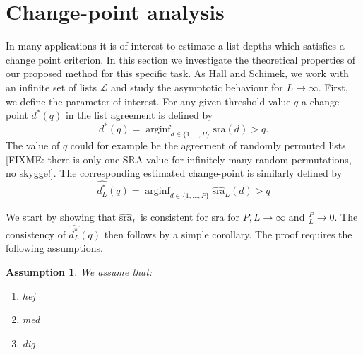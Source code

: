 \documentclass[12pt,a4paper]{article}
\DeclareMathOperator{\arginf}{arginf}
\theoremstyle{plain}
\newtheorem{assumption}{Assumption}
\begin{document}
\section{Change-point analysis}\label{sec:chgpoint}
In many applications it is of interest to estimate a list depths which
satisfies a change point criterion. In this section we investigate the
theoretical properties of our proposed method for this specific
task. As Hall and Schimek, we work with an infinite set of lists
$\mathcal{L}$ and study the asymptotic behaviour for $L\to\infty$.
First, we define the parameter of interest. For any given threshold value $q$
a change-point $d^\ast(q)$ in the list agreement is defined by
\begin{equation}
  d^\ast(q) = \arginf_{d\in\{1,\dots,P\}}\textrm{sra}(d)>q.
\end{equation}
The value of $q$ could for example be the agreement of randomly
permuted lists [FIXME: there is only one SRA value for infinitely many
random permutations, no skygge!].
The corresponding estimated change-point is similarly defined by
\begin{equation}
\widehat{d^\ast_L}(q) = \arginf_{d\in\{1,\dots,P\}}\widehat{\textrm{sra}}_L(d)>q
\end{equation}


We start by showing that $\widehat{\textrm{sra}}_L$ is consistent for $\textrm{sra}$ for $P,L \rightarrow \infty$ and $\frac{P}{L} \rightarrow 0$.
The consistency of $\widehat{d^\ast_L}(q)$ then follows by a simple corollary. The proof requires the following assumptions.

\begin{assumption}
We assume that:
\begin{enumerate}[label=\Alph*)]
\item{hej}
\item{med}
\item{dig}
\end{enumerate}
\end{assumption}
\end{document}
